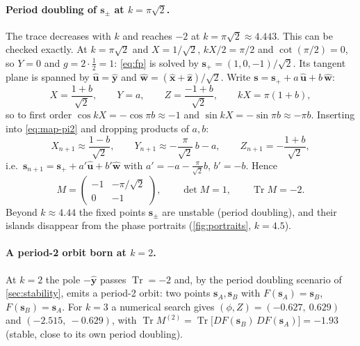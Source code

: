 \documentclass[11pt,a4paper]{article}
\newcommand{\vs}{\bm{s}}
\newcommand{\Tr}{\operatorname{Tr}}
\begin{document}
\paragraph{Period doubling of $\vs_\pm$ at $k = \pi\sqrt2$.} The trace decreases with $k$ and reaches $-2$ at $k =
\pi\sqrt2 \approx 4.443$. This can be checked exactly. At $k = \pi\sqrt2$ and $X = 1/\sqrt2$, $kX/2 = \pi/2$ and
$\cot(\pi/2) = 0$, so $Y = 0$ and $g = 2\cdot\frac12 = 1$: \eqref{eq:fp} is solved by $\vs_+ = (1, 0, -1)/\sqrt2$.
Its tangent plane is spanned by $\hat{\bm u} = \hat{\bm y}$ and $\hat{\bm w} = (\hat{\bm x}+\hat{\bm z})/\sqrt2$.
Write $\vs = \vs_+ + a\,\hat{\bm u} + b\,\hat{\bm w}$:
\begin{equation*}
  X = \frac{1+b}{\sqrt2}, \qquad Y = a, \qquad Z = \frac{-1+b}{\sqrt2}, \qquad kX = \pi(1+b),
\end{equation*}
so to first order $\cos kX = -\cos\pi b \approx -1$ and $\sin kX = -\sin\pi b \approx -\pi b$. Inserting into
\eqref{eq:map-pi2} and dropping products of $a, b$:
\begin{equation*}
  X_{n+1} \approx \frac{1-b}{\sqrt2}, \qquad Y_{n+1} \approx -\frac{\pi}{\sqrt2}\,b - a, \qquad Z_{n+1} = -\frac{1+b}{\sqrt2},
\end{equation*}
i.e.\ $\vs_{n+1} = \vs_+ + a'\hat{\bm u} + b'\hat{\bm w}$ with $a' = -a - \frac{\pi}{\sqrt2}b$, $b' = -b$. Hence
\begin{equation*}
  M = \begin{pmatrix} -1 & -\pi/\sqrt2\\ 0 & -1\end{pmatrix}, \qquad \det M = 1, \qquad \Tr M = -2 .
\end{equation*}
Beyond $k\approx4.44$ the fixed points $\vs_\pm$ are unstable (period doubling), and their islands disappear from the
phase portraits (\cref{fig:portraits}, $k = 4.5$).

\paragraph{A period-2 orbit born at $k = 2$.} At $k=2$ the pole $-\hat{\bm y}$ passes $\Tr = -2$ and, by the period
doubling scenario of \cref{sec:stability}, emits a period-2 orbit: two points $\vs_A, \vs_B$ with $F(\vs_A) = \vs_B$,
$F(\vs_B) = \vs_A$. For $k = 3$ a numerical search gives $(\phi, Z) = (-0.627,\ 0.629)$ and $(-2.515,\ -0.629)$, with
$\Tr M^{(2)} = \Tr\big[DF(\vs_B)\,DF(\vs_A)\big] = -1.93$ (stable, close to its own period doubling).
\end{document}
